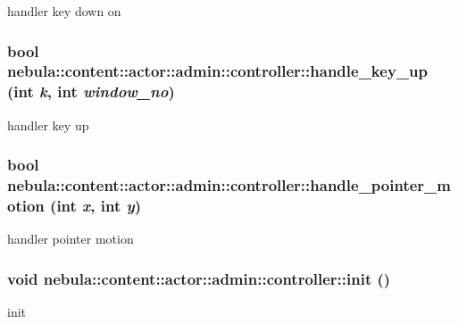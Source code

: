 handler key down on \hypertarget{classnebula_1_1content_1_1actor_1_1admin_1_1controller_a7eb829a7220499807c9f6b08464b85d5}{
\subsubsection[{handle\_\-key\_\-up}]{\setlength{\rightskip}{0pt plus 5cm}bool nebula::content::actor::admin::controller::handle\_\-key\_\-up (int {\em k}, \/  int {\em window\_\-no})}}
\label{classnebula_1_1content_1_1actor_1_1admin_1_1controller_a7eb829a7220499807c9f6b08464b85d5}


handler key up \hypertarget{classnebula_1_1content_1_1actor_1_1admin_1_1controller_a0d6c91e2a563a8e85314ca2511df74e7}{
\subsubsection[{handle\_\-pointer\_\-motion}]{\setlength{\rightskip}{0pt plus 5cm}bool nebula::content::actor::admin::controller::handle\_\-pointer\_\-motion (int {\em x}, \/  int {\em y})}}
\label{classnebula_1_1content_1_1actor_1_1admin_1_1controller_a0d6c91e2a563a8e85314ca2511df74e7}


handler pointer motion \hypertarget{classnebula_1_1content_1_1actor_1_1admin_1_1controller_aaabeb54ec0f83d9b836562384a9a1f4d}{
\subsubsection[{init}]{\setlength{\rightskip}{0pt plus 5cm}void nebula::content::actor::admin::controller::init ()}}
\label{classnebula_1_1content_1_1actor_1_1admin_1_1controller_aaabeb54ec0f83d9b836562384a9a1f4d}
init 

